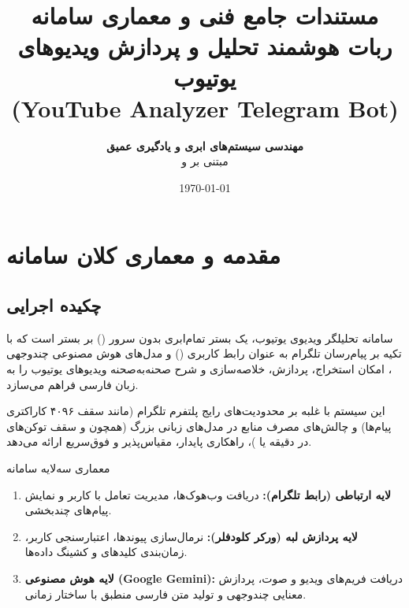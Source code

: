 \documentclass[11pt,a4paper]{report}
\title{\Huge\textbf{مستندات جامع فنی و معماری سامانه}\\
\LARGE\textbf{ربات هوشمند تحلیل و پردازش ویدیوهای یوتیوب}\\
\large\textbf{(YouTube Analyzer Telegram Bot)}}
\author{\textbf{مهندسی سیستم‌های ابری و یادگیری عمیق}\\
مبتنی بر \lr{Cloudflare Workers} و \lr{Google Gemini AI}}
\date{\today}
\begin{document}
\maketitle

\tableofcontents
\newpage

\chapter{مقدمه و معماری کلان سامانه}

\section{چکیده اجرایی}
سامانه تحلیلگر ویدیوی یوتیوب، یک بستر تمام‌ابری بدون سرور () بر بستر  است که با تکیه بر پیام‌رسان تلگرام به عنوان رابط کاربری () و مدل‌های هوش مصنوعی چندوجهی ، امکان استخراج، پردازش، خلاصه‌سازی و شرح صحنه‌به‌صحنه ویدیوهای یوتیوب را به زبان فارسی فراهم می‌سازد.

این سیستم با غلبه بر محدودیت‌های رایج پلتفرم تلگرام (مانند سقف ۴۰۹۶ کاراکتری پیام‌ها) و چالش‌های مصرف منابع در مدل‌های زبانی بزرگ (همچون  و سقف توکن‌های در دقیقه یا )، راهکاری پایدار، مقیاس‌پذیر و فوق‌سریع ارائه می‌دهد.

\begin{infobox}{معماری سه‌لایه سامانه}
\begin{enumerate}
    \item \textbf{لایه ارتباطی (رابط تلگرام):} دریافت وب‌هوک‌ها، مدیریت تعامل با کاربر و نمایش پیام‌های چندبخشی.
    \item \textbf{لایه پردازش لبه (ورکر کلودفلر):} نرمال‌سازی پیوندها، اعتبارسنجی کاربر، زمان‌بندی کلیدهای  و کشینگ داده‌ها.
    \item \textbf{لایه هوش مصنوعی (Google Gemini):} دریافت فریم‌های ویدیو و صوت، پردازش معنایی چندوجهی و تولید متن فارسی منطبق با ساختار زمانی.
\end{enumerate}
\end{infobox}
\end{document}
